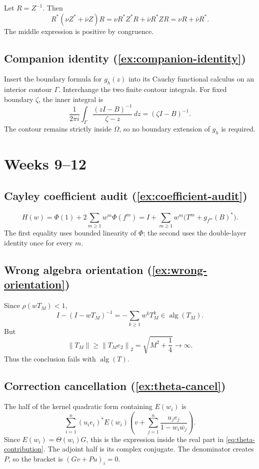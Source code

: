 \documentclass[11pt,oneside,openany]{book}
\theoremstyle{definition}
\theoremstyle{remark}
\newcommand{\alg}{\operatorname{alg}}
\newcommand{\norm}[1]{\left\lVert #1\right\rVert}
\begin{document}
Let \(R=Z^{-1}\).  Then
\[
  R^*(\nu Z^*+\overline\nu Z)R
  =
  \nu R^*Z^*R+\overline\nu R^*ZR
  =
  \nu R+\overline\nu R^*.
\]
The middle expression is positive by congruence.

\subsection*{Companion identity (\cref{ex:companion-identity})}

Insert the boundary formula for \(g_h(z)\) into its Cauchy functional
calculus on an interior contour \(\Gamma\).  Interchange the two finite
contour integrals.  For fixed boundary \(\zeta\), the inner integral is
\[
  \frac{1}{2\pi i}\int_\Gamma
  \frac{(zI-B)^{-1}}{\zeta-z}\,dz
  =(\zeta I-B)^{-1}.
\]
The contour remains strictly inside \(\Omega\), so no boundary
extension of \(g_h\) is required.

\section{Weeks 9--12}

\subsection*{Cayley coefficient audit (\cref{ex:coefficient-audit})}

\[
  H(w)
  =\Phi(1)+2\sum_{m\geq1}w^m\Phi(f^m)
  =I+\sum_{m\geq1}w^m
   \bigl(T^m+g_{f^m}(B)^*\bigr).
\]
The first equality uses bounded linearity of \(\Phi\); the second uses
the double-layer identity once for every \(m\).

\subsection*{Wrong algebra orientation (\cref{ex:wrong-orientation})}

Since \(\rho(wT_M)<1\),
\[
  I-(I-wT_M)^{-1}
  =-\sum_{k\geq1}w^kT_M^k\in\alg(T_M).
\]
But
\[
  \norm{T_M}\geq\norm{T_Me_2}_2
  =\sqrt{M^2+\frac14}\to\infty.
\]
Thus the conclusion fails with \(\alg(T)\).

\subsection*{Correction cancellation (\cref{ex:theta-cancel})}

The half of the kernel quadratic form containing \(E(w_i)\) is
\[
  \sum_{i=1}^n
  (u_ie_i)^*E(w_i)
  \left(
    v+\sum_{j=1}^n
    \frac{u_je_j}{1-w_i\overline{w_j}}
  \right).
\]
Since \(E(w_i)=\Theta(w_i)G\), this is the expression inside the real
part in \eqref{eq:theta-contribution}.  The adjoint half is its complex
conjugate.  The denominator creates \(P\), so the bracket is
\((Gv+Pu)_i=0\).
\end{document}
